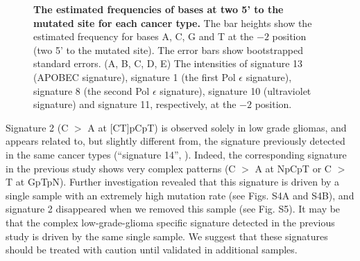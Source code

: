 \documentclass[10pt,letterpaper]{article}
\begin{document}
\begin{figure}[h]
\caption{{\bf The estimated frequencies of bases at two 5' to the mutated site for each cancer type.}
The bar heights show the estimated frequency for bases A, C, G and T at the $-2$ position (two 5' to the mutated site).
The error bars show bootstrapped standard errors.
(A, B, C, D, E) The intensities of signature 13 (APOBEC signature), signature 1 (the first Pol $\epsilon$ signature),
signature 8 (the second Pol $\epsilon$ signature), signature 10 (ultraviolet signature) and signature 11, respectively, at the $-2$ position.
}
\label{two5prime}
\end{figure}


Signature 2 (C $>$ A at [CT]pCpT) is observed solely in low grade gliomas, and
appears related to, but slightly different from, the signature previously detected in the same cancer types (``signature 14'', \cite{pmid23318258}). 
Indeed, the corresponding signature in the previous study shows very complex patterns (C $>$ A at NpCpT or C $>$ T at GpTpN). Further investigation
revealed that this signature is driven by 
a single sample with an extremely high mutation rate (see Figs. S4A and S4B), and signature 2 disappeared when we removed this sample (see Fig. S5).
It may be that the complex low-grade-glioma specific signature detected in the previous study is driven by the same single sample.
We suggest that these signatures should be treated with caution until validated in additional samples. 
 
\end{document}
